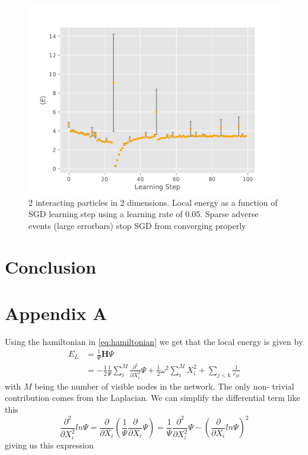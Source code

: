 \documentclass[11pt,a4paper,titlepage]{article}
\begin{document}
\begin{figure}[H]
\center
\includegraphics[trim=0cm 0.3cm 0cm 0.0cm,scale = 0.6]{D2_P_2I_Y__S_2pow19_eqS_2pow18_GD_ls_v_E_LR_0.050000_NH_2.pdf}
\caption[numerically unstable run- electron positions]{2 interacting particles in 2 dimensions. Local energy as a function of SGD learning step using a learning rate of $0.05$. Sparse adverse events (large errorbars) stop SGD from converging properly}

\end{figure}
\section{Conclusion}


\section{Appendix A}\label{app_A}
Using the hamiltonian in \eqref{eq:hamiltonian} we get that the local energy is given by
$$
\begin{aligned}
E_{L} &=\frac{1}{\Psi} \mathbf{H} \Psi \\
&=-\frac{1}{2} \frac{1}{\Psi} \sum_{i}^{M} \frac{\partial^2}{\partial X_i^2} \Psi+\frac{1}{2} \omega^{2} \sum_{i}^{M} X_{i}^{2}+\sum_{j<k} \frac{1}{r_{j k}}
\end{aligned}
$$
with $M$ being the number of visible nodes in the network. The only non- trivial contribution comes from the Laplacian. We can simplify the differential term like this
$$
\frac{\partial^2}{\partial X_i^2} ln\Psi = \frac{\partial}{\partial X_i}\left( \frac{1}{\Psi}\frac{\partial}{\partial X_i} \Psi \right) = \frac{1}{\Psi}\frac{\partial^2}{\partial X_i^2} \Psi - \left( \frac{\partial}{\partial X_i} ln\Psi \right)^2
$$
giving us this expression
\end{document}
